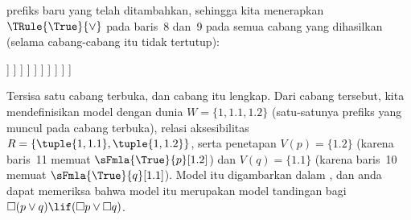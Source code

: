 \documentclass[../../../include/open-logic-section]{subfiles}
\begin{document}
{\begin{ex}
  prefiks baru yang telah ditambahkan, sehingga kita menerapkan
  $\TRule{\True}{\lor}$ pada baris~8 dan~9 pada semua cabang yang dihasilkan
  (selama cabang-cabang itu tidak tertutup):
  \begin{oltableau}
    [\pFmla{\False}{\Box(p \lor q) \lif (\Box p \lor \Box q)}{1},
      just = \TAss, checked
      [\pFmla{\True}{\Box(p \lor q)}{1},
        just = {\TRule{\False}{\lif}[1]}, checked
        [\pFmla{\False}{\Box p \lor \Box q}{1},
          just = {\TRule{\False}{\lif}[1]}, checked
          [\pFmla{\False}{\Box p}{1},
            just = {\TRule{\False}{\lor}[3]}, checked
            [\pFmla{\False}{\Box q}{1},
              just = {\TRule{\False}{\lor}[3]}, checked
              [\pFmla{\False}{p}{1.1}, 
                just = {\TRule{\False}{\Box}[4]}, checked
                [\pFmla{\False}{q}{1.2}, 
                  just = {\TRule{\False}{\Box}[5]}, checked
                  [\pFmla{\True}{p \lor q}{1.1}, 
                    just = {\TRule{\True}{\Box}[2]}, checked
                    [\pFmla{\True}{p \lor q}{1.2}, 
                      just = {\TRule{\True}{\Box}[2]}, checked
                      [\pFmla{\True}{p}{1.1},
                        just = {\TRule{\True}{\lor}[8]}, checked, close
                      ]
                      [\pFmla{\True}{q}{1.1},
                        just = {\TRule{\True}{\lor}[8]}, checked
                        [\pFmla{\True}{p}{1.2},
                          just = {\TRule{\True}{\lor}[9]}, checked]
                        [\pFmla{\True}{q}{1.2},
                          just = {\TRule{\True}{\lor}[9]}, checked, close]
                      ]
                    ]
                  ]
                ]
              ]
            ]
          ]
        ]
      ]
    ]
  \end{oltableau}
  Tersisa satu cabang terbuka, dan cabang itu lengkap. Dari cabang tersebut,
  kita mendefinisikan model dengan dunia $W = \{1, 1.1, 1.2\}$ (satu-satunya
  prefiks yang muncul pada cabang terbuka), relasi aksesibilitas
  $R = \{\tuple{1, 1.1}, \tuple{1, 1.2}\}$, serta penetapan
  $V(p) = \{1.2\}$ (karena baris~11 memuat
  $\sFmla{\True}{p}[1.2]$) dan $V(q) = \{1.1\}$ (karena baris~10 memuat
  $\sFmla{\True}{q}[1.1]$). Model itu digambarkan dalam
  , dan anda dapat memeriksa bahwa model itu merupakan
  model tandingan bagi $\Box(p \lor q) \lif (\Box p \lor \Box q)$.
  \begin{figure}
  \begin{center}
    \begin{tikzpicture}[modal]

\end{tikzpicture}
\end{center}
\end{figure}
\end{ex}}
\end{document}
